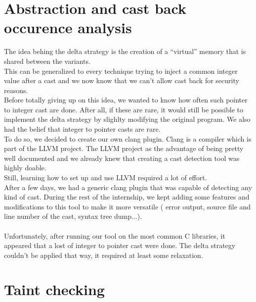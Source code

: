 \documentclass[english]{enstaPRE}
\begin{document}
\section{Abstraction and cast back occurence analysis}

The idea behing the delta strategy is the creation of a ``virtual'' memory that is shared between the variants. \\
This can be generalized to every technique trying to inject a common integer value after a cast and we now know that we can't allow
cast back for security reasons. \\ Before totally giving up on this idea, we wanted to know how often such pointer to integer cast are
done. After all, if these are rare, it would still be possible to implement the delta strategy by slighlty modifying the original 
program. We also had the belief that integer to pointer casts are rare.\\ 
To do so, we decided to create our own clang plugin. Clang is a compiler which is part of the LLVM project. The LLVM project as 
the advantage of being pretty well documented and we already knew that creating a cast detection tool was highly doable. \\
Still, learning how to set up and use LLVM required a lot of effort. \\
After a few days, we had a generic clang plugin that was capable of detecting any kind of cast. During the rest of the internship,
we kept adding some features and modifications to this tool to make it more versatile ( error output, source file and line number of 
the cast, syntax tree dump...). \\ \\
Unfortunately, after running our tool on the most common C libraries, it appeared that a lost of integer to pointer cast were done.
The delta strategy couldn't be applied that way, it required at least some relaxation.

\section{Taint checking}
\end{document}
